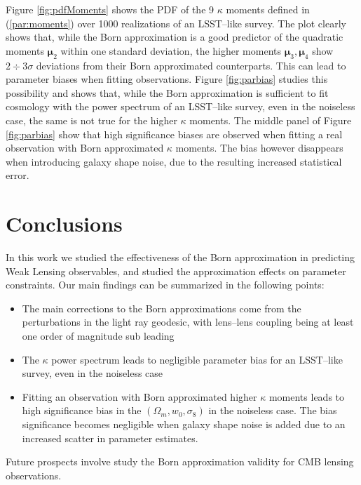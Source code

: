 \documentclass[reprint,aps,prd,superscriptaddress,showkeys,showpacs]{revtex4-1}
\begin{document}
Figure \ref{fig:pdfMoments} shows the PDF of the 9 $\kappa$ moments defined in (\ref{par:moments}) over 1000 realizations of an LSST--like survey. The plot clearly shows that, while the Born approximation is a good predictor of the quadratic moments $\pmb{\mu}_2$ within one standard deviation, the higher moments $\pmb{\mu}_3,\pmb{\mu}_4$ show $2\div 3\sigma$ deviations from their Born approximated counterparts. This can lead to parameter biases when fitting observations. Figure \ref{fig:parbias} studies this possibility and shows that, while the Born approximation is sufficient to fit cosmology with the power spectrum of an LSST--like survey, even in the noiseless case, the same is not true for the higher $\kappa$ moments. The middle panel of Figure \ref{fig:parbias} show that high significance biases are observed when fitting a real observation with Born approximated $\kappa$ moments. The bias however disappears when introducing galaxy shape noise, due to the resulting increased statistical error.  


\section{Conclusions}
In this work we studied the effectiveness of the Born approximation in predicting Weak Lensing observables, and studied the approximation effects on parameter constraints. Our main findings can be summarized in the following points:

\begin{itemize}
\item The main corrections to the Born approximations come from the perturbations in the light ray geodesic, with lens--lens coupling being at least one order of magnitude sub leading
\item The $\kappa$ power spectrum leads to negligible parameter bias for an LSST--like survey, even in the noiseless case
\item Fitting an observation with Born approximated higher $\kappa$ moments leads to high significance bias in the $(\Omega_m,w_0,\sigma_8)$ in the noiseless case. The bias significance becomes negligible when galaxy shape noise is added due to an increased scatter in parameter estimates.   
\end{itemize}
%
Future prospects involve study the Born approximation validity for CMB lensing observations. 
\end{document}
